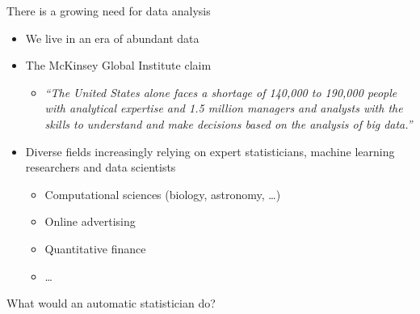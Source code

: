 \begin{frame}{There is a growing need for data analysis}
  \begin{itemize}
    \item We live in an era of abundant data
    \vspace{\baselineskip}
    \item The McKinsey Global Institute claim
    \begin{itemize}
      \item \emph{``The United States alone faces a shortage of 140,000 to 190,000 people with analytical expertise and 1.5 million managers and analysts with the skills to understand and make decisions based on the analysis of big data.''}
    \end{itemize}
    \vspace{\baselineskip}
    \item Diverse fields increasingly relying on expert statisticians, machine learning researchers and data scientists \eg
    \begin{itemize}
       \item Computational sciences (\eg biology, astronomy, \ldots)
       \item Online advertising
       \item Quantitative finance
       \item \ldots
     \end{itemize}
  \end{itemize}
\end{frame}

\begin{frame}{What would an automatic statistician do?}
  
\end{frame}


